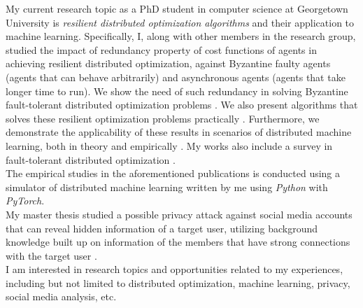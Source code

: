 \documentclass[letterpaper,11pt]{article}
\begin{document}
My current research topic as a PhD student in computer science at Georgetown University is \textit{resilient distributed optimization algorithms} and their application to machine learning. Specifically, I, along with other members in the research group, studied the impact of redundancy property of cost functions of agents in achieving resilient distributed optimization, against Byzantine faulty agents (agents that can behave arbitrarily) and asynchronous agents (agents that take longer time to run). We show the need of such redundancy in solving Byzantine fault-tolerant distributed optimization problems \cite{liu2021approximate}. We also present algorithms that solves these resilient optimization problems practically \cite{liu2021approximate, liu2021asynchronous}. Furthermore, we demonstrate the applicability of these results in scenarios of distributed machine learning, both in theory and empirically \cite{gupta2021byzantine, liu2021approximate, liu2021asynchronous, liu2021utilizing}. My works also include a survey in fault-tolerant distributed optimization \cite{liu2021survey}. \\

The empirical studies in the aforementioned publications is conducted using a simulator of distributed machine learning written by me using \textit{Python} with \textit{PyTorch}. \\

My master thesis studied a possible privacy attack against social media accounts that can reveal hidden information of a target user, utilizing background knowledge built up on information of the members that have strong connections with the target user \cite{liu2020information}. \\

I am interested in research topics and opportunities related to my experiences, including but not limited to distributed optimization, machine learning, privacy, social media analysis, etc.


\footnotesize{
}
\end{document}
